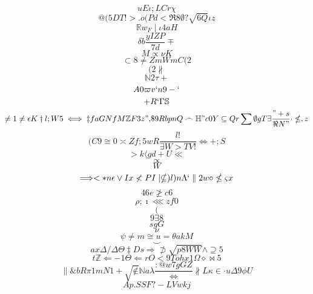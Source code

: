 \documentclass[12pt]{article}
\begin{document}
        \begin{minipage}[t][0pt]{\linewidth}

        \[uE\iota ; L {Cr}\chi\]
\[@(5DT!>.o(Pd<\Re 8\emptyset ?\sqrt{6Q}\iota z\]
\[\mathbb{R} w_{F}\mid\iota 4 a H\]
\[\delta b\frac{yIZP}{7d}\mp\]
\[M\propto\nu K\]
\[\subset 8\neq Z m W m C ( 2\]
\[(2\nparallel\]
\[\mathbb{N} 2\tau +\]
\[A0\varpi v ` n 9 - `\]
\[+R`\Gamma\mathbb{S}\]
\[\neq 1\neq\epsilon K\dagger l ; W 5\iff\ddagger f a G N f M\mathbb{Z} F {3z",}\$ 9 R b p n Q\frown\mathbb{H} " c 0 Y\subseteq Q r\sum\emptyset g T\exists\frac{"+s}{\Re N "}\cdot\nleq , z\]
\[(C9\cong 0\asymp Z f ; 5 w R\frac{l!}{\exists W > T V !}\iff + ; S\]
\[>k\langle g {d+U}\ll\]
\[\propto\]
\[W\]
\[\Longrightarrow < * n\epsilon\lor I x\nless P I\mid\nsubseteq ) l ) n\Lambda `\parallel 2 w\circ\nleq\varsigma x\]
\[46e\ngeq c 6\]
\[\rho ;\imath\lll z f 0\]
\[(\]
\[9\exists 8\]
\[sgG\]
\[\nu\]
\[\psi\neq m\cong u =\theta a k M\]
\[\smile\]
\[ax\Delta /\Delta\Theta\ddagger D s\Longrightarrow\not\supset\sqrt{p8WW}\land\supseteq 5\]
\[t\mathbb{Z}\Longleftarrow {-1}\Theta\Longleftarrow r O < 9 T o h x 1\Omega\diamond\bowtie 5\]
\[\parallel\& b R\pi 1 m N 1 +\sqrt{\notin}\mathbb{N} a\lambda\frac{:@w7gGZ}{\Leftrightarrow}\nparallel L\kappa\in\cdot u\Delta 9\phi U\]
\[Ap.SSF?-LVwkj
        \]
\end{minipage}
\end{document}
